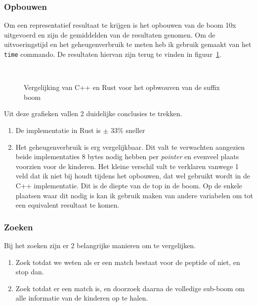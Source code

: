 \subsubsection{Opbouwen}
Om een representatief resultaat te krijgen is het opbouwen van de boom 10x uitgevoerd en zijn de gemiddelden van de resultaten genomen.
Om de uitvoeringstijd en het geheugenverbruik te meten heb ik gebruik gemaakt van het \texttt{time} commando.
De resultaten hiervan zijn terug te vinden in figuur~\ref{fig:tree_building}.
\begin{figure}[H]
    \centering
    \\[4ex] %

    \caption{Vergelijking van C++ en Rust voor het opbwouven van de suffix boom}\label{fig:tree_building}
\end{figure}

Uit deze grafieken vallen 2 duidelijke conclusies te trekken.
\begin{enumerate}
    \item De implementatie in Rust is $\pm$ 33\% sneller
    \item Het geheugenverbruik is erg vergelijkbaar.
    Dit valt te verwachten aangezien beide implementaties 8 bytes nodig hebben per \textit{pointer} en evenveel plaats voorzien voor de kinderen.
    Het kleine verschil valt te verklaren vanwege 1 veld dat ik niet bij houdt tijdens het opbouwen, dat wel gebruikt wordt in de C++ implementatie.
    Dit is de diepte van de top in de boom.
    Op de enkele plaatsen waar dit nodig is kan ik gebruik maken van andere variabelen om tot een equivalent resultaat te komen.
\end{enumerate}

\subsubsection{Zoeken}
Bij het zoeken zijn er 2 belangrijke manieren om te vergelijken.
\begin{enumerate}
    \item Zoek totdat we weten als er een match bestaat voor de peptide of niet, en stop dan.
    \item Zoek totdat er een match is, en doorzoek daarna de volledige sub-boom om alle informatie van de kinderen op te halen.

\end{enumerate}

